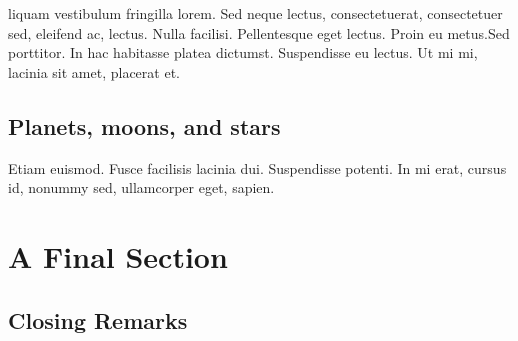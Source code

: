 \documentclass[]{notes}
\begin{document}
  \lipsum[10]
  \begin{note}
    liquam vestibulum fringilla lorem. Sed neque lectus, consectetuerat, consectetuer sed, eleifend ac, lectus. Nulla facilisi. Pellentesque eget lectus. Proin eu metus.Sed porttitor. In hac habitasse platea dictumst. Suspendisse eu lectus. Ut mi mi, lacinia sit amet, placerat et.
  \end{note}
  \lipsum[11]
  \begin{fig}%
  \end{fig}
  \lipsum[12-13]
  \subsection{Planets, moons, and stars}
  \lipsum[14]
  \begin{remark}
    Etiam euismod. Fusce facilisis lacinia dui. Suspendisse potenti. In mi erat, cursus id, nonummy sed, ullamcorper eget, sapien.
  \end{remark}
  \lipsum[14]


  \section{A Final Section}
  \lipsum[15]
  \subsection{Closing Remarks}
  \lipsum[16]

  
\end{document}
